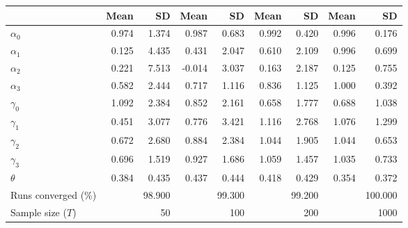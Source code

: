 
\begin{tabular}[t]{lrrrrrrrr}
\toprule
  & Mean & SD & Mean  & SD  & Mean   & SD   & Mean    & SD   \\
\midrule
$\alpha_{0}$ & 0.974 & 1.374 & 0.987 & 0.683 & 0.992 & 0.420 & 0.996 & 0.176\\
$\alpha_{1}$ & 0.125 & 4.435 & 0.431 & 2.047 & 0.610 & 2.109 & 0.996 & 0.699\\
$\alpha_{2}$ & 0.221 & 7.513 & -0.014 & 3.037 & 0.163 & 2.187 & 0.125 & 0.755\\
$\alpha_{3}$ & 0.582 & 2.444 & 0.717 & 1.116 & 0.836 & 1.125 & 1.000 & 0.392\\
$\gamma_{0}$ & 1.092 & 2.384 & 0.852 & 2.161 & 0.658 & 1.777 & 0.688 & 1.038\\
$\gamma_{1}$ & 0.451 & 3.077 & 0.776 & 3.421 & 1.116 & 2.768 & 1.076 & 1.299\\
$\gamma_{2}$ & 0.672 & 2.680 & 0.884 & 2.384 & 1.044 & 1.905 & 1.044 & 0.653\\
$\gamma_{3}$ & 0.696 & 1.519 & 0.927 & 1.686 & 1.059 & 1.457 & 1.035 & 0.733\\
$\theta$ & 0.384 & 0.435 & 0.437 & 0.444 & 0.418 & 0.429 & 0.354 & 0.372\\
Runs converged (\%) &  & 98.900 &  & 99.300 &  & 99.200 &  & 100.000\\
Sample size ($T$) &  & 50 &  & 100 &  & 200 &  & 1000\\
\bottomrule
\end{tabular}
